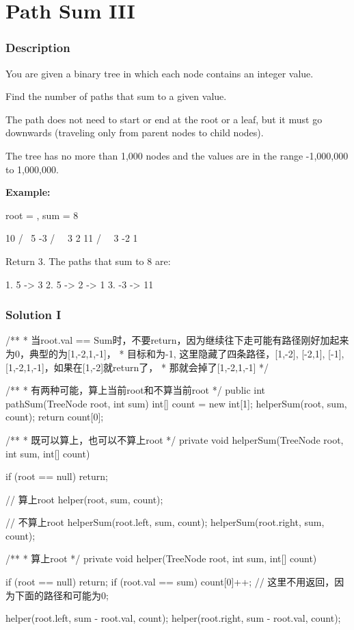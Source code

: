 \newpage

\section{Path Sum III} %

\subsubsection{Description}
You are given a binary tree in which each node contains an integer value.

Find the number of paths that sum to a given value.

The path does not need to start or end at the root or a leaf, but it must go downwards (traveling only from parent nodes to child nodes).

The tree has no more than 1,000 nodes and the values are in the range -1,000,000 to 1,000,000.

\textbf{Example:}

root = , sum = 8
\begin{Code}
      10
     /  \
    5   -3
   / \    \
  3   2   11
 / \   \
3  -2   1
\end{Code}

Return 3. The paths that sum to 8 are:
\begin{Code}
1.  5 -> 3
2.  5 -> 2 -> 1
3. -3 -> 11
\end{Code}

\newpage

\subsubsection{Solution I}

\begin{Code}
/**
 * 当root.val == Sum时，不要return，因为继续往下走可能有路径刚好加起来为0，典型的为[1,-2,1,-1]，
 * 目标和为-1, 这里隐藏了四条路径，[1,-2], [-2,1], [-1], [1,-2,1,-1]，如果在[1,-2]就return了，
 * 那就会掉了[1,-2,1,-1]
 */

/**
 * 有两种可能，算上当前root和不算当前root
 */
public int pathSum(TreeNode root, int sum) {
    int[] count = new int[1];
    helperSum(root, sum, count);
    return count[0];
}

/**
 *  既可以算上，也可以不算上root
 */
private void helperSum(TreeNode root, int sum, int[] count) {
    if (root == null) {
        return;
    }

    // 算上root
    helper(root, sum, count);

    // 不算上root
    helperSum(root.left, sum, count);
    helperSum(root.right, sum, count);
}

/**
 * 算上root
 */
private void helper(TreeNode root, int sum, int[] count) {
    if (root == null) {
        return;
    }
    if (root.val == sum) {
        count[0]++;
       // 这里不用返回，因为下面的路径和可能为0;
    }

    helper(root.left, sum - root.val, count);
    helper(root.right, sum - root.val, count);
}
\end{Code}

